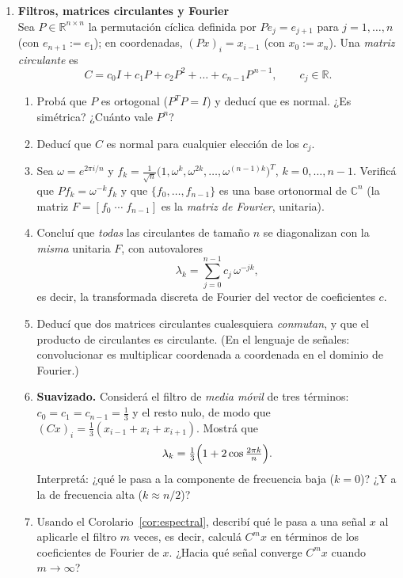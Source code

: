 \begin{enumerate}
\item {\bf Filtros, matrices circulantes y Fourier}   %
\\
Sea $P\in\mathbb{R}^{n\times n}$ la permutación cíclica definida por
$Pe_j=e_{j+1}$ para $j=1,\dots,n$ (con $e_{n+1}:=e_1$); en coordenadas,
$(Px)_i=x_{i-1}$ (con $x_0:=x_n$). Una \emph{matriz circulante} es
\[
C=c_0I+c_1P+c_2P^{2}+\dots+c_{n-1}P^{\,n-1},\qquad c_j\in\mathbb{R}.
\]
\begin{enumerate}[label=\alph*)]
    \item Probá que $P$ es ortogonal ($P^{T}P=I$) y deducí que es normal.
          ¿Es simétrica? ¿Cuánto vale $P^{n}$?
    \item Deducí que $C$ es normal para cualquier elección de los $c_j$.
    \item Sea $\omega=e^{2\pi i/n}$ y
          $f_k=\tfrac{1}{\sqrt n}\bigl(1,\omega^{k},\omega^{2k},\dots,\omega^{(n-1)k}\bigr)^{T}$,
          $k=0,\dots,n-1$. Verificá que $Pf_k=\omega^{-k}f_k$ y que
          $\{f_0,\dots,f_{n-1}\}$ es una base ortonormal de $\mathbb{C}^{n}$
          (la matriz $F=[f_0\;\cdots\;f_{n-1}]$ es la \emph{matriz de Fourier}, unitaria).
    \item Concluí que \emph{todas} las circulantes de tamaño $n$ se diagonalizan con la
          \emph{misma} unitaria $F$, con autovalores
          \[
            \lambda_k=\sum_{j=0}^{n-1}c_j\,\omega^{-jk},
          \]
          es decir, la transformada discreta de Fourier del vector de coeficientes $c$.
    \item Deducí que dos matrices circulantes cualesquiera \emph{conmutan}, y que el
          producto de circulantes es circulante. (En el lenguaje de señales:
          convolucionar es multiplicar coordenada a coordenada en el dominio de Fourier.)
    \item {\bf Suavizado.} Considerá el filtro de \emph{media móvil} de tres términos:
          $c_0=c_1=c_{n-1}=\tfrac13$ y el resto nulo, de modo que
          $(Cx)_i=\tfrac13(x_{i-1}+x_i+x_{i+1})$. Mostrá que
          \[
            \lambda_k=\tfrac13\Bigl(1+2\cos\tfrac{2\pi k}{n}\Bigr).
          \]
          Interpretá: ¿qué le pasa a la componente de frecuencia baja ($k=0$)?
          ¿Y a la de frecuencia alta ($k\approx n/2$)?
    \item Usando el Corolario~\ref{cor:espectral}, describí qué le pasa a una señal
          $x$ al aplicarle el filtro $m$ veces, es decir, calculá $C^{m}x$ en términos
          de los coeficientes de Fourier de $x$. ¿Hacia qué señal converge $C^{m}x$
          cuando $m\to\infty$?
\end{enumerate}


\end{enumerate}
